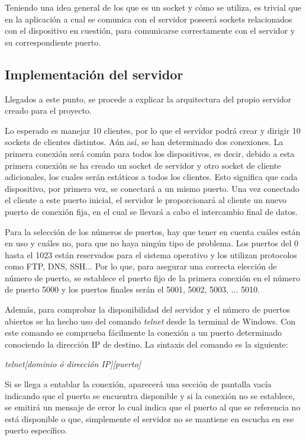 \documentclass[a4paper,11pt]{book}
\begin{document}
				 Teniendo una idea general de los que es un socket y cómo se utiliza, es trivial que en la aplicación a cual se comunica con el servidor poseerá sockets relacionados con el dispositivo en cuestión, para comunicarse correctamente con el servidor y su correspondiente puerto.
				 
				 \subsection{Implementación del servidor}
				 Llegados a este punto, se procede a explicar la arquitectura del propio servidor creado para el proyecto.
				 
				 Lo esperado es manejar 10 clientes, por lo que el servidor podrá crear y dirigir 10 sockets de clientes distintos. Aún así, se han determinado dos conexiones. La primera conexión será común para todos los dispositivos, es decir, debido a esta primera conexión se ha creado un socket de servidor y otro socket de cliente adicionales, los cuales serán estáticos a todos los clientes. Esto significa que cada dispositivo, por primera vez, se conectará a un mismo puerto. Una vez conectado el cliente a este puerto inicial, el servidor le proporcionará al cliente un nuevo puerto de conexión fija, en el cual se llevará a cabo el intercambio final de datos.
				 
				 Para la selección de los números de puertos, hay que tener en cuenta cuáles están en uso y cuáles no, para que no haya ningún tipo de problema. Los puertos del 0 hasta el 1023 están reservados para el sistema operativo y los utilizan protocolos como FTP, DNS, SSH... Por lo que, para asegurar una correcta elección de número de puerto, se establece el puerto fijo de la primera conexión en el número de puerto 5000 y los puertos finales serán el 5001, 5002, 5003, ... 5010. 
				 
				 Además, para comprobar la disponibilidad del servidor y el número de puertos abiertos se ha hecho uso del comando \textit{telnet} desde la terminal de Windows. Con este comando se comprueba fácilmente la conexión a un puerto determinado conociendo la dirección IP de destino. La sintaxis del comando es la siguiente:
				 \begin{center}
				 \textit{telnet[dominio ó dirección IP][puerto]}
				 \end{center}
				 
				 Si se llega a entablar la conexión, aparecerá una sección de pantalla vacía indicando que el puerto se encuentra disponible y si la conexión no se establece, se emitirá un mensaje de error lo cual indica que el puerto al que se referencia no está disponible o que, simplemente el servidor no se mantiene en escucha en ese puerto específico.
				 
\end{document}
